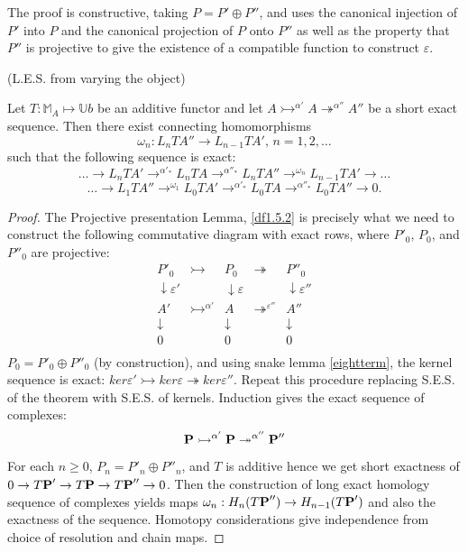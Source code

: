 The proof is constructive, taking $P = P'\oplus P''$, and uses the
canonical injection of $P'$ into $P$ and the canonical projection
of $P$ onto $P''$ as well as the property that $P''$ is projective
to give the existence of a compatible function to construct
$\varepsilon$.



\begin{theorem}(L.E.S. from varying the object\label{df1.5.3})

Let $T:\mathbb M_A\mapsto \mathbb U b$ be an additive
functor and let
$A\rightarrowtail^{\alpha'}A\twoheadrightarrow^{\alpha''}A''$ be a
short exact sequence. Then there exist connecting homomorphisms
$$\omega_n: L_nTA''\rightarrow L_{n-1}TA',\,n=1,2,\dots$$
such that the following sequence is exact:
$$\dots\rightarrow L_nTA'\rightarrow^{\alpha'_*} L_nTA
\rightarrow^{\alpha''_*}L_nTA''\rightarrow^{\omega_n}
L_{n-1}TA'\rightarrow\dots$$
$$\dots \rightarrow L_1TA''\rightarrow^{\omega_1}
L_0TA'\rightarrow^{\alpha'_*}L_0TA\rightarrow^{\alpha''_*}L_0TA''\rightarrow
0.$$
\end{theorem}

\begin{proof}

The Projective presentation Lemma, \ref{df1.5.2} is precisely what
we need to construct the following commutative diagram with exact
rows, where $P'_0$, $P_0$, and $P''_0$ are projective:
$$\begin{array}{ccccc}
  P'_0 & \rightarrowtail & P_0 & \twoheadrightarrow & P''_0 \\
  \downarrow \varepsilon' &  & \downarrow \varepsilon &  & \downarrow \varepsilon'' \\
  A' & \rightarrowtail ^{\alpha'} & A & \twoheadrightarrow^{\varepsilon''} & A'' \\
  \downarrow &  & \downarrow &  & \downarrow \\
  0 &  & 0 &  & 0 \\
\end{array}$$
$P_0 = P'_0 \oplus P''_0$ (by construction), and using snake lemma
\ref{eightterm}, the kernel sequence is exact: $ker \varepsilon'
\rightarrowtail ker \varepsilon \twoheadrightarrow ker
\varepsilon''$. Repeat this procedure replacing S.E.S. of the
theorem with S.E.S. of kernels. Induction gives the exact sequence
of complexes:
$$\textbf P \rightarrowtail^{\alpha'} \textbf P \twoheadrightarrow
^{\alpha''} \textbf P''$$

For each $n\geq 0$, $P_n = P'_n \oplus P''_n$, and $T$ is additive
hence we get short exactness of $0\rightarrow T\textbf P'
\rightarrow T\textbf P \rightarrow T\textbf P'' \rightarrow 0$.
Then the construction of long exact homology sequence of complexes
yields maps $\omega_n : H_n(T\textbf P'')\rightarrow H_{n-1}
(T\textbf P')$ and also the exactness of the sequence. Homotopy
considerations give independence from choice of resolution and
chain maps.
\end{proof}

